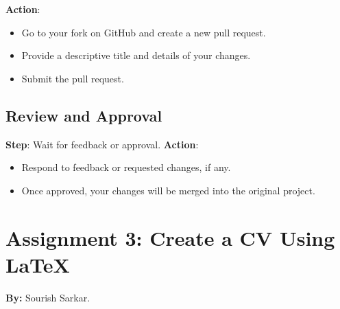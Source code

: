 \documentclass[a4paper,12pt]{article}
\begin{document}
\textbf{Action}:
\begin{itemize}
    \item Go to your fork on GitHub and create a new pull request.
    \item Provide a descriptive title and details of your changes.
    \item Submit the pull request.
\end{itemize}

\subsection{Review and Approval}
\textbf{Step}: Wait for feedback or approval.
\textbf{Action}:
\begin{itemize}
    \item Respond to feedback or requested changes, if any.
    \item Once approved, your changes will be merged into the original project.
\end{itemize}
\newpage
\section{Assignment 3: Create a CV Using LaTeX}

\textbf{By:} Sourish Sarkar.
\end{document}
